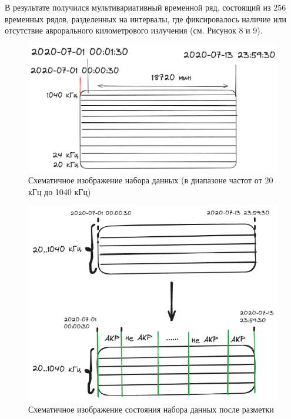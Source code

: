 \documentclass[spec, och, diploma]{SCWorks}
\begin{document}
        В результате получился мультивариативный временной ряд, состоящий из 256
        временных рядов, разделенных на интервалы, где фиксировалось наличие или
        отсутствие аврорального километрового излучения (см. Рисунок 8 и 9).

        \begin{figure}[H]
            \centering
            \includegraphics[width=1\textwidth]{pic/data.png}
            \caption{Схематичное изображение набора данных (в диапазоне частот от 20 кГц до 1040 кГц)}
        \end{figure}

        \begin{figure}[H]
            \centering
            \includegraphics[width=1\textwidth]{pic/labeling.png}
            \caption{Схематичное изображение состояния набора данных после разметки}
        \end{figure}
\end{document}
